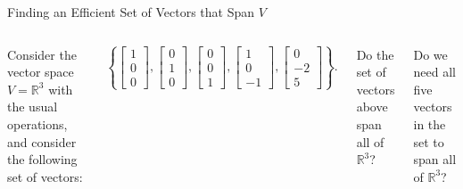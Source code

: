 \documentclass[xcolor=dvipsnames,aspectratio=169,t]{beamer}
\begin{document}
\begin{frame}{Finding an Efficient Set of Vectors that Span $V$}


\begin{columns}[T]

\column{0.425\tw}

Consider the vector space $V = \mathbb{R}^3$ with the usual operations, and consider the following set of vectors:

\[ \left\{ \begin{bmatrix} 1 \\ 0 \\ 0 \end{bmatrix} ,  \begin{bmatrix} 0 \\ 1 \\ 0 \end{bmatrix} , \begin{bmatrix} 0 \\ 0 \\ 1 \end{bmatrix} , \begin{bmatrix} 1 \\ 0 \\ -1 \end{bmatrix}, \begin{bmatrix} 0 \\ -2 \\ 5 \end{bmatrix}  \right\} . \]


\bb
\ii Do the set of vectors above span all of $\mathbb{R}^3$?   \ms 

\ii Do we need all five vectors in the set to span all of $\mathbb{R}^3$? \ms
\ee

\column{0.575\tw}



\end{columns}
\end{frame}
\end{document}
